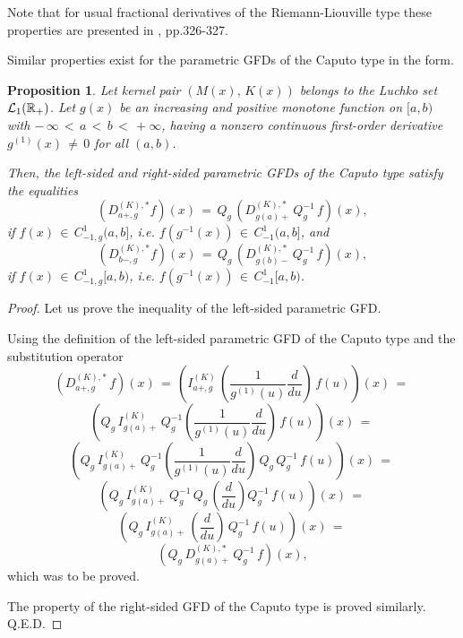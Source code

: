 \documentclass[12pt]{article}
\newtheorem{Proposition}{Proposition}
\begin{document}
Note that for usual fractional derivatives of the Riemann-Liouville type
these properties are presented in \cite{SKM}, pp.326-327. 


Similar properties exist for the parametric GFDs of the Caputo type in the form.

\begin{Proposition} \label{D-QDQ-C}
Let kernel pair $(M(x), \, K(x))$ belongs to the Luchko set ${\cal L}_{1}(\mathbb{R}_{+})$.
Let $g(x)$ be an increasing and positive monotone function on $[a, b)$ 
with $ - \, \infty \, < \, a \, < \, b \, < \, +\infty$, 
having a nonzero continuous first-order derivative $g^{(1)}(x) \, \ne \, 0$ for all $(a,b)$.

Then, the left-sided and right-sided parametric GFDs of the Caputo type satisfy the equalities
\begin{equation}
({}D^{(K),*}_{a+,g} f)(x) \, = \, 
Q_{g} \, (D^{(K),*}_{g(a)+} \, Q^{-1}_g \, f)(x) ,
\end{equation}
if $f(x) \, \in \, C^{1}_{-1,g}(a,b]$, i.e. 
$f(g^{-1}(x)) \, \in \, C^{1}_{-1}(a,b]$, and 
\begin{equation}
(D^{(K),*}_{b-,g} f)(x) \, = \, 
Q_{g} \, (D^{(K),*}_{g(b)-} \, Q^{-1}_g \, f)(x) ,
\end{equation}
if $f(x) \, \in \, C^{1}_{-1,g}[a,b)$, i.e. 
$f(g^{-1}(x)) \, \in \, C^{1}_{-1}[a,b)$. 
\end{Proposition}



\begin{proof}
Let us prove the inequality of the left-sided parametric GFD.

Using the definition of the left-sided parametric GFD of the Caputo type and the substitution operator
\[
(D^{(K),*}_{a+,g} \, f)(x) \, = \, 
\left(I^{(K)}_{a+,g} \, 
\left(\frac{1}{g^{(1)}(u)} \frac{d}{du} \right)\, f(u) \right)(x) \, = \, 
\]
\[
\left(Q_g \, I^{(K)}_{g(a)+} \, Q^{-1}_g
\left(\frac{1}{g^{(1)}(u)} \frac{d}{du} \right) \, 
f(u) \right)(x) \, = \, 
\]
\[
\left(Q_g \, I^{(K)}_{g(a)+} \, Q^{-1}_g
\left(\frac{1}{g^{(1)}(u)} \frac{d}{du} \right) \, 
Q_g \, Q^{-1}_g \, f(u) \right)(x) \, = \, 
\]
\[
\left(Q_g \, I^{(K)}_{g(a)+} \, Q^{-1}_g \, Q_g \,
\left( \frac{d}{du} \right) Q^{-1}_g \, f(u) \right)(x) \, = \, 
\]
\[
\left(Q_g \, I^{(K)}_{g(a)+} \, \left( \frac{d}{du} \right) \, Q^{-1}_g \, f(u) \right)(x) \, = \, 
\]
\[
\left(Q_g \, D^{(K),*}_{g(a)+} \, Q^{-1}_g \, f \right)(x) ,
\]
which was to be proved. 

The property of the right-sided GFD of the Caputo type is proved similarly.
Q.E.D.
\end{proof}
\end{document}

